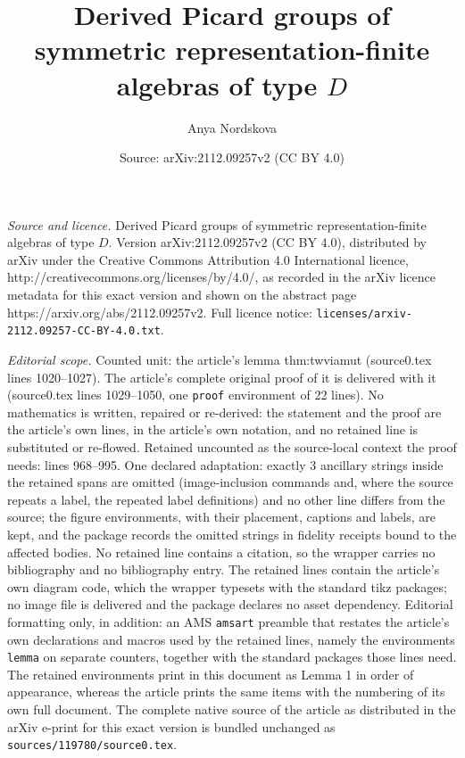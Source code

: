 \documentclass[10pt,a4paper]{amsart}
\title{Derived Picard groups of symmetric representation-finite algebras of type $D$}
\author{Anya Nordskova}
\date{Source: arXiv:2112.09257v2 (CC BY 4.0)}
\begin{document}
\maketitle

\noindent\emph{Source and licence.} Derived Picard groups of symmetric representation-finite algebras of type $D$. Version arXiv:2112.09257v2 (CC BY 4.0), distributed by arXiv under the Creative Commons Attribution 4.0 International licence, http://creativecommons.org/licenses/by/4.0/, as recorded in the arXiv licence metadata for this exact version and shown on the abstract page https://arxiv.org/abs/2112.09257v2. Full licence notice: \texttt{licenses/arxiv-2112.09257-CC-BY-4.0.txt}.\par\smallskip

\noindent\textit{Editorial scope.} Counted unit: the article's lemma thm:twviamut (source0.tex lines 1020--1027). The article's complete original proof of it is delivered with it (source0.tex lines 1029--1050, one \texttt{proof} environment of 22 lines). No mathematics is written, repaired or re-derived: the statement and the proof are the article's own lines, in the article's own notation, and no retained line is substituted or re-flowed.  Retained uncounted as the source-local context the proof needs: lines 968--995.  One declared adaptation: exactly 3 ancillary strings inside the retained spans are omitted (image-inclusion commands and, where the source repeats a label, the repeated label definitions) and no other line differs from the source; the figure environments, with their placement, captions and labels, are kept, and the package records the omitted strings in fidelity receipts bound to the affected bodies.  No retained line contains a citation, so the wrapper carries no bibliography and no bibliography entry.  The retained lines contain the article's own diagram code, which the wrapper typesets with the standard tikz packages; no image file is delivered and the package declares no asset dependency.  Editorial formatting only, in addition: an AMS \texttt{amsart} preamble that restates the article's own declarations and macros used by the retained lines, namely the environments \texttt{lemma} on separate counters, together with the standard packages those lines need.  The retained environments print in this document as Lemma 1 in order of appearance, whereas the article prints the same items with the numbering of its own full document.  The complete native source of the article as distributed in the arXiv e-print for this exact version is bundled unchanged as \texttt{sources/119780/source0.tex}.
\end{document}
